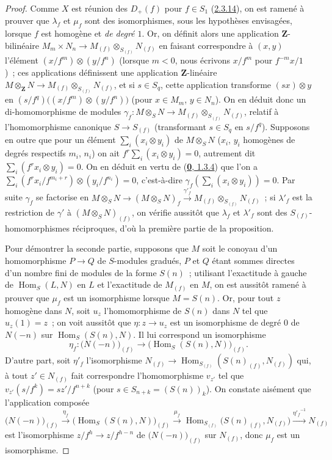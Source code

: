 \begin{proof}
Comme $X$ est réunion des $D_+(f)$ pour $f\in S_1$
(\hyperref[II.2.3.14-fr]{2.3.14}), on est ramené à prouver que $\lambda_f$
et $\mu_f$ sont des isomorphismes, sous les hypothèses envisagées, lorsque
$f$ est homogène et \emph{de degré $1$}. Or, on définit alors une
application $\mathbf{Z}$-bilinéaire
$M_m\times N_n\longrightarrow M_{(f)}\otimes_{S_{(f)}}N_{(f)}$
en faisant correspondre à $(x,y)$ l'élément
$(x/f^m)\otimes(y/f^n)$ (lorsque $m<0$, nous écrivons $x/f^m$ pour
$f^{-m}x/1$)~; ces applications définissent une application
$\mathbf{Z}$-linéaire
$M\otimes_{\mathbf{Z}}N\longrightarrow M_{(f)}\otimes_{S_{(f)}}N_{(f)}$,
et si $s\in S_q$, cette application transforme $(sx)\otimes y$ en
$(s/f^q)\bigl((x/f^m)\otimes(y/f^n)\bigr)$
(pour $x\in M_m$, $y\in N_n$). On en déduit donc un di-homomorphisme de
modules
$\gamma_f:M\otimes_S N\longrightarrow M_{(f)}\otimes_{S_{(f)}}N_{(f)}$,
relatif à l'homomorphisme canonique $S\to S_{(f)}$ (transformant
$s\in S_q$ en $s/f^q$). Supposons en outre que pour un élément
$\sum_i(x_i\otimes y_i)$ de $M\otimes_S N$ ($x_i$, $y_i$ homogènes de
degrés respectifs $m_i$, $n_i$) on ait
$f^r\sum_i(x_i\otimes y_i)=0$,
autrement dit $\sum_i(f^rx_i\otimes y_i)=0$. On en déduit en vertu de
(\hyperref[0.1.3.4-fr]{\textbf{0}, 1.3.4}) que l'on a
$\sum_i(f^rx_i/f^{m_i+r})\otimes(y_i/f^{n_i})=0$,
c'est-à-dire $\gamma_f(\sum_i(x_i\otimes y_i))=0$. Par suite $\gamma_f$
se factorise en
$M\otimes_S N\longrightarrow(M\otimes_S N)_f\xrightarrow{\gamma'_f}M_{(f)}\otimes_{S_{(f)}}N_{(f)}$~;
si $\lambda'_f$ est la restriction de $\gamma'$
à $(M\otimes_S N)_{(f)}$, on vérifie aussitôt que $\lambda_f$ et
$\lambda'_f$ sont des $S_{(f)}$-homomorphismes réciproques, d'où la
première partie de la proposition.

Pour démontrer la seconde partie, supposons que $M$ soit le conoyau d'un
homomorphisme $P\to Q$ de $S$-modules gradués, $P$ et $Q$ étant sommes
directes d'un nombre fini de modules de la forme $S(n)$~; utilisant
l'exactitude à gauche de $\operatorname{Hom}_S(L,N)$ en $L$ et l'exactitude
de $M_{(f)}$ en $M$, on est aussitôt ramené à prouver que $\mu_f$ est un
isomorphisme lorsque $M=S(n)$. Or, pour tout $z$ homogène dans $N$, soit
$u_z$ l'homomorphisme de $S(n)$ dans $N$ tel que $u_z(1)=z$~; on voit
aussitôt que $\eta:z\to u_z$ est un isomorphisme de degré $0$ de
$N(-n)$ sur $\operatorname{Hom}_S(S(n),N)$. Il lui correspond un
isomorphisme
\[
  \eta_f:\bigl(N(-n)\bigr)_{(f)}
  \longrightarrow
  \bigl(\operatorname{Hom}_S(S(n),N)\bigr)_{(f)}.
\]
D'autre part, soit $\eta'_f$ l'isomorphisme
$N_{(f)}\to\operatorname{Hom}_{S_{(f)}}(S(n)_{(f)},N_{(f)})$
qui, à tout $z'\in N_{(f)}$ fait correspondre l'homomorphisme $v_{z'}$ tel
que $v_{z'}(s/f^k)=sz'/f^{n+k}$ (pour
$s\in S_{n+k}=(S(n))_k$). On constate aisément que l'application composée
\[
  \bigl(N(-n)\bigr)_{(f)}
  \xrightarrow{\eta_f}
  \bigl(\operatorname{Hom}_S(S(n),N)\bigr)_{(f)}
  \xrightarrow{\mu_f}
  \operatorname{Hom}_{S_{(f)}}\bigl(S(n)_{(f)},N_{(f)}\bigr)
  \xrightarrow{{\eta'_f}^{-1}}N_{(f)}
\]
est l'isomorphisme $z/f^h\to z/f^{h-n}$ de
$\bigl(N(-n)\bigr)_{(f)}$ sur $N_{(f)}$, donc $\mu_f$ est un isomorphisme.
\end{proof}


